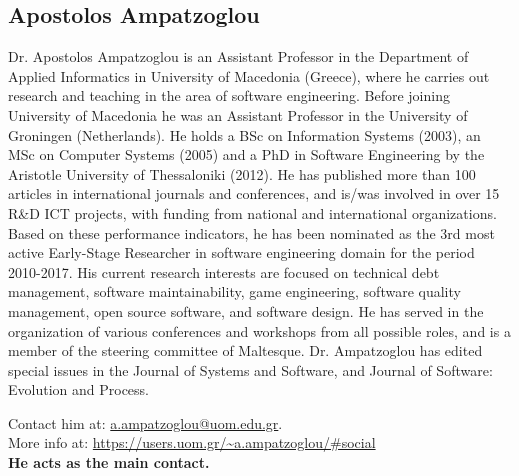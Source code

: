 \subsection{Apostolos Ampatzoglou}
Dr. Apostolos Ampatzoglou is an Assistant Professor in the Department of Applied Informatics in University of Macedonia (Greece), where he carries out research and teaching in the area of software engineering. Before joining University of Macedonia he was an Assistant Professor in the University of Groningen (Netherlands). He holds a BSc on Information Systems (2003), an MSc on Computer Systems (2005) and a PhD in Software Engineering by the Aristotle University of Thessaloniki (2012). He has published more than 100 articles in international journals and conferences, and is/was involved in over 15 R\&D ICT projects, with funding from national and international organizations. Based on these performance indicators, he has been nominated as the 3rd most active Early-Stage Researcher in software engineering domain for the period 2010-2017. His current research interests are focused on technical debt management, software maintainability, game engineering, software quality management, open source software, and software design. He has served in the organization of various conferences and workshops from all possible roles, and is a member of the steering committee of Maltesque. Dr. Ampatzoglou has edited special issues in the Journal of Systems and Software, and Journal of Software: Evolution and Process.

\smallskip
\noindent Contact him at: \href{mailto:a.ampatzoglou@uom.edu.gr}{a.ampatzoglou@uom.edu.gr}.\\
More info at: \url{https://users.uom.gr/~a.ampatzoglou/#social}\\
\textbf{He acts as the main contact.}
